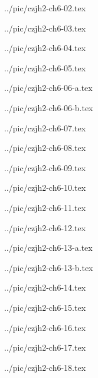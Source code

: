 

../pic/czjh2-ch6-02.tex



../pic/czjh2-ch6-03.tex



../pic/czjh2-ch6-04.tex



../pic/czjh2-ch6-05.tex



../pic/czjh2-ch6-06-a.tex



../pic/czjh2-ch6-06-b.tex



../pic/czjh2-ch6-07.tex



../pic/czjh2-ch6-08.tex



../pic/czjh2-ch6-09.tex



../pic/czjh2-ch6-10.tex



../pic/czjh2-ch6-11.tex



../pic/czjh2-ch6-12.tex



../pic/czjh2-ch6-13-a.tex



../pic/czjh2-ch6-13-b.tex



../pic/czjh2-ch6-14.tex



../pic/czjh2-ch6-15.tex



../pic/czjh2-ch6-16.tex



../pic/czjh2-ch6-17.tex



../pic/czjh2-ch6-18.tex

